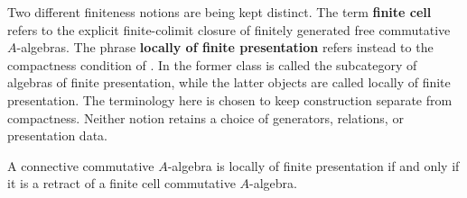 \begin{remark}
\label{rem:finite-cell-terminology}
Two different finiteness notions are being kept distinct. The term
\textbf{finite cell} refers to the explicit finite-colimit closure of finitely
generated free commutative \(A\)-algebras. The phrase \textbf{locally of
finite presentation} refers instead to the compactness condition of
. In
\cite{LurieHigherAlgebra} the former class is called the subcategory of
algebras of finite presentation, while the latter objects are called locally
of finite presentation. The terminology here is chosen to keep construction
separate from compactness. Neither notion retains a choice of generators,
relations, or presentation data.
\end{remark}

\begin{proposition}
\label{prop:finite-presentation-compactness-criterion}
A connective commutative \(A\)-algebra is locally of finite presentation if
and only if it is a retract of a finite cell commutative \(A\)-algebra.
\end{proposition}

